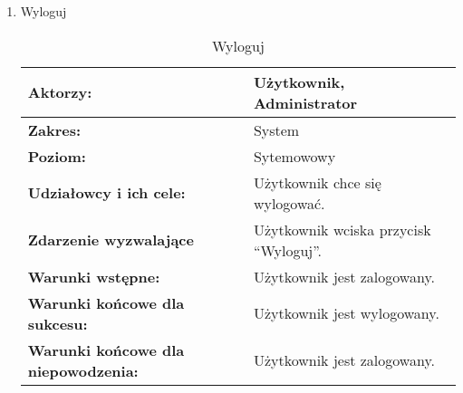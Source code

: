 \begin{enumerate}[label=(\Roman*)]
	\item Wyloguj
	\begin{table}[H]
\centering
\caption{Wyloguj}
\label{wyloguj}
\begin{tabular}{|p{7cm}|p{7cm}|}
  \hline 
  \textbf{Aktorzy:} & Użytkownik, Administrator\\
  \hline
  \textbf{Zakres:} & System \\
	\hline
  \textbf{Poziom:} & Sytemowowy \\
	\hline
  \textbf{Udziałowcy i ich cele: } & Użytkownik chce się wylogować. \\
	\hline
  \textbf{Zdarzenie wyzwalające } & Użytkownik wciska przycisk “Wyloguj”. \\
	\hline
  \textbf{Warunki wstępne: } & Użytkownik jest zalogowany.
 \\
	\hline
  \textbf{Warunki końcowe dla sukcesu:} & Użytkownik jest wylogowany.
 \\
	\hline
  \textbf{Warunki końcowe dla niepowodzenia:} & Użytkownik jest zalogowany. \\
  \hline
\end{tabular} 
\end{table}


\end{enumerate}
